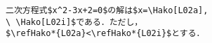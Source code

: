 \begin{verbatim}
二次方程式$x^2-3x+2=0$の解は$x=\Hako[L02a],
\ \Hako[L02i]$である．ただし，
$\refHako*{L02a}<\refHako*{L02i}$とする．
\end{verbatim}
